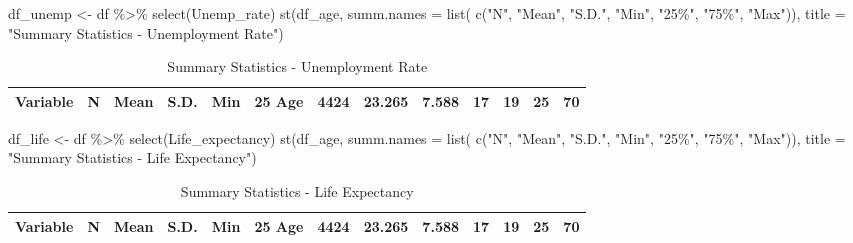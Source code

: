 \documentclass[
]{article}
\newenvironment{Shaded}{\begin{snugshade}}{\end{snugshade}}
\newcommand{\AttributeTok}[1]{\textcolor[rgb]{0.77,0.63,0.00}{#1}}
\newcommand{\FunctionTok}[1]{\textcolor[rgb]{0.00,0.00,0.00}{#1}}
\newcommand{\NormalTok}[1]{#1}
\newcommand{\OtherTok}[1]{\textcolor[rgb]{0.56,0.35,0.01}{#1}}
\newcommand{\SpecialCharTok}[1]{\textcolor[rgb]{0.00,0.00,0.00}{#1}}
\newcommand{\StringTok}[1]{\textcolor[rgb]{0.31,0.60,0.02}{#1}}
\begin{document}
\begin{Shaded}
\begin{Highlighting}[]
\NormalTok{df\_unemp }\OtherTok{\textless{}{-}}\NormalTok{ df }\SpecialCharTok{\%\textgreater{}\%} \FunctionTok{select}\NormalTok{(Unemp\_rate)}
\FunctionTok{st}\NormalTok{(df\_age,}
   \AttributeTok{summ.names =} \FunctionTok{list}\NormalTok{(}
     \FunctionTok{c}\NormalTok{(}\StringTok{"N"}\NormalTok{, }\StringTok{"Mean"}\NormalTok{, }\StringTok{"S.D."}\NormalTok{, }\StringTok{"Min"}\NormalTok{, }\StringTok{"25\%"}\NormalTok{, }\StringTok{"75\%"}\NormalTok{, }\StringTok{"Max"}\NormalTok{)),}
   \AttributeTok{title =} \StringTok{"Summary Statistics {-} Unemployment Rate"}\NormalTok{)}
\end{Highlighting}
\end{Shaded}

\begin{table}

\caption{\label{tab:unnamed-chunk-5}Summary Statistics - Unemployment Rate}
\centering
\begin{tabular}[t]{llllllll}
\toprule
Variable & N & Mean & S.D. & Min & 25%
\midrule
Age & 4424 & 23.265 & 7.588 & 17 & 19 & 25 & 70\\
\bottomrule
\end{tabular}
\end{table}

\begin{Shaded}
\begin{Highlighting}[]
\NormalTok{df\_life }\OtherTok{\textless{}{-}}\NormalTok{ df }\SpecialCharTok{\%\textgreater{}\%} \FunctionTok{select}\NormalTok{(Life\_expectancy)}
\FunctionTok{st}\NormalTok{(df\_age,}
   \AttributeTok{summ.names =} \FunctionTok{list}\NormalTok{(}
     \FunctionTok{c}\NormalTok{(}\StringTok{"N"}\NormalTok{, }\StringTok{"Mean"}\NormalTok{, }\StringTok{"S.D."}\NormalTok{, }\StringTok{"Min"}\NormalTok{, }\StringTok{"25\%"}\NormalTok{, }\StringTok{"75\%"}\NormalTok{, }\StringTok{"Max"}\NormalTok{)),}
   \AttributeTok{title =} \StringTok{"Summary Statistics {-} Life Expectancy"}\NormalTok{)}
\end{Highlighting}
\end{Shaded}

\begin{table}

\caption{\label{tab:unnamed-chunk-5}Summary Statistics - Life Expectancy}
\centering
\begin{tabular}[t]{llllllll}
\toprule
Variable & N & Mean & S.D. & Min & 25%
\midrule
Age & 4424 & 23.265 & 7.588 & 17 & 19 & 25 & 70\\
\bottomrule
\end{tabular}
\end{table}
\end{document}
